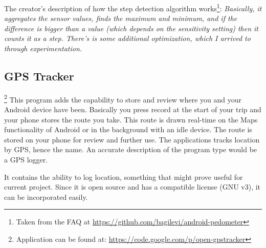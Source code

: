 The creator's description of how the step detection algorithm works\footnote{Taken from the FAQ at \url{https://github.com/bagilevi/android-pedometer}}: \textit{Basically, it aggregates the sensor values, finds the maximum and minimum, and if the difference is bigger than a value (which depends on the sensitivity setting) then it counts it as a step. There's is some additional optimization, which I arrived to through experimentation.}

\subsection{GPS Tracker}\footnote{Application can be found at: \url{https://code.google.com/p/open-gpstracker}}
This program adds the capability to store and review where you and your Android device have been. Basically you press record at the start of your trip and your phone stores the route you take. This route is drawn real-time on the Maps functionality of Android or in the background with an idle device. The route is stored on your phone for review and further use. The applications tracks location by GPS, hence the name. An accurate description of the program type would be a GPS logger.

It contains the ability to log location, something that might prove useful for current project. Since it is open source and has a compatible license (GNU v3), it can be incorporated easily.